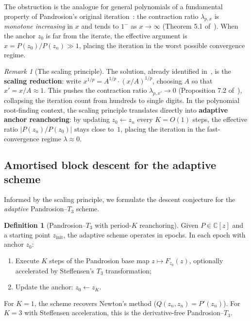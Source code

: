\documentclass[10pt,a4paper,oneside]{book}
\theoremstyle{definition}
\newtheorem{definition}[theorem]{Definition}
\theoremstyle{remark}
\newtheorem{remark}[theorem]{Remark}
\newcommand{\CC}{\mathbb{C}}
\begin{document}
The obstruction is the analogue for general polynomials of a fundamental property of Pandrosion's original iteration~\cite{besevic2026}: the contraction ratio $\lambda_{p,x}$ is \emph{monotone increasing} in $x$ and tends to $1^-$ as $x \to \infty$ (Theorem 5.1 of~\cite{besevic2026}).  When the anchor $z_0$ is far from the iterate, the effective argument is $x = P(z_0)/P(z_n) \gg 1$, placing the iteration in the worst possible convergence regime.

\begin{remark}[The scaling principle]
\label{rem:scaling_principle}
The solution, already identified in~\cite{besevic2026}, is the \textbf{scaling reduction}: write $x^{1/p} = A^{1/p} \cdot (x/A)^{1/p}$, choosing $A$ so that $x' = x/A \approx 1$.  This pushes the contraction ratio $\lambda_{p,x'} \to 0$ (Proposition 7.2 of~\cite{besevic2026}), collapsing the iteration count from hundreds to single digits.  In the polynomial root-finding context, the scaling principle translates directly into \textbf{adaptive anchor reanchoring}: by updating $z_0 \leftarrow z_n$ every $K = O(1)$ steps, the effective ratio $|P(z_n)/P(z_0)|$ stays close to~$1$, placing the iteration in the fast-convergence regime $\lambda \approx 0$.
\end{remark}

\subsection{Amortised block descent for the adaptive scheme}
\label{sec:amortised_block}

Informed by the scaling principle, we formulate the descent conjecture for the \emph{adaptive} Pandrosion--$T_3$ scheme.

\begin{definition}[Pandrosion--$T_3$ with period-$K$ reanchoring]
\label{def:pandrosion_T3_adaptive}
Given $P \in \CC[z]$ and a starting point $z_{\mathrm{init}}$, the adaptive scheme operates in epochs.  In each epoch with anchor $z_0$:
\begin{enumerate}
  \item Execute $K$ steps of the Pandrosion base map $z \mapsto F_{z_0}(z)$, optionally accelerated by Steffensen's $T_3$ transformation;
  \item Update the anchor: $z_0 \leftarrow z_K$.
\end{enumerate}
For $K=1$, the scheme recovers Newton's method ($Q(z_n,z_n) = P'(z_n)$).  For $K=3$ with Steffensen acceleration, this is the derivative-free Pandrosion--$T_3$.
\end{definition}
\end{document}

